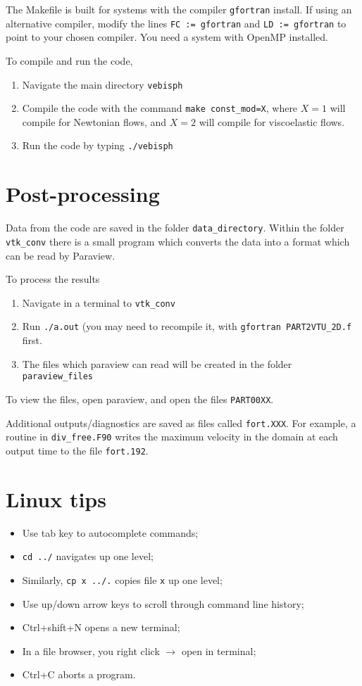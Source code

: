 \documentclass[notitlepage]{revtex4-2}
\begin{document}
The Makefile is built for systems with the compiler \verb|gfortran| install. If using an alternative compiler, modify the lines \verb|FC := gfortran| and \verb|LD := gfortran| to point to your chosen compiler. You need a system with OpenMP installed.

To compile and run the code,
\begin{enumerate}
\item Navigate the main directory \verb|vebisph|
\item Compile the code with the command \verb|make const_mod=X|, where $X=1$ will compile for Newtonian flows, and $X=2$ will compile for viscoelastic flows.
\item Run the code by typing \verb|./vebisph|
\end{enumerate}

\section{Post-processing}

Data from the code are saved in the folder \verb|data_directory|. Within the folder \verb|vtk_conv| there is a small program which converts the data into a format which can be read by Paraview. 

To process the results
\begin{enumerate}
\item Navigate in a terminal to \verb|vtk_conv|
\item Run \verb|./a.out| (you may need to recompile it, with \verb|gfortran PART2VTU_2D.f| first.
\item The files which paraview can read will be created in the folder \verb|paraview_files|
\end{enumerate}

To view the files, open paraview, and open the files \verb|PART00XX|.

Additional outputs/diagnostics are saved as files called \verb|fort.XXX|. For example, a routine in \verb|div_free.F90| writes the maximum velocity in the domain at each output time to the file \verb|fort.192|.

\section{Linux tips}
\begin{itemize}
\item Use tab key to autocomplete commands;
\item \verb|cd ../| navigates up one level;
\item Similarly, \verb|cp x ../.| copies file \verb|x| up one level;
\item Use up/down arrow keys to scroll through command line history;
\item Ctrl+shift+N opens a new terminal;
\item In a file browser, you right click $\to$ open in terminal;
\item Ctrl+C aborts a program.
\end{itemize}




\end{document}
